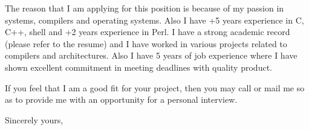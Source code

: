 \documentclass[11pt]{letter} %
\newcommand{\cmt}[1]{}
\begin{document}
\begin{letter}{
  \cmt{
  Jane Smith \\
Recruitment Officer \\
The Corporation \\
123 Pleasant Lane \\
City, State 12345
  }
}
The reason that I am applying for this position is because of my  passion in systems, compilers
and operating systems. Also I have +5 years experience in C, C++, shell and +2 years experience in Perl.
I have a strong academic record (please refer to the resume) and I have worked in various projects related to 
compilers and architectures.
Also I have 5 years of job experience where I have shown excellent commitment in meeting deadlines with quality product.

If you feel that I am a good fit for your project, then you may call or mail me so as to provide me with an opportunity for a personal interview.

\closing{Sincerely yours,}

\end{letter}
\end{document}
